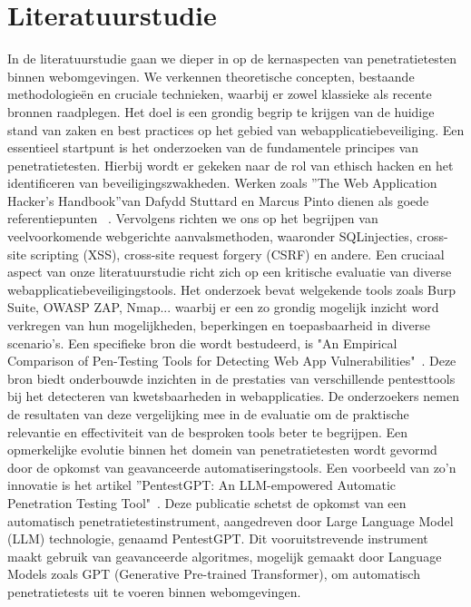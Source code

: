 \section{Literatuurstudie}%
\label{sec:literatuurstudie}

In de literatuurstudie gaan we dieper in op de
kernaspecten van penetratietesten binnen webomgevingen.
We verkennen theoretische concepten,
bestaande methodologieën en cruciale
technieken, waarbij er zowel klassieke als recente
bronnen raadplegen. Het doel is een grondig begrip
te krijgen van de huidige stand van zaken en
best practices op het gebied van webapplicatiebeveiliging.
Een essentieel startpunt is het onderzoeken
van de fundamentele principes van penetratietesten.
Hierbij wordt er gekeken naar de rol van
ethisch hacken en het identificeren van beveiligingszwakheden.
Werken zoals ”The Web Application
Hacker’s Handbook”van Dafydd Stuttard
en Marcus Pinto dienen als goede referentiepunten
~\autocite{Stuttard2011}. Vervolgens richten
we ons op het begrijpen van veelvoorkomende
webgerichte aanvalsmethoden, waaronder SQLinjecties,
cross-site scripting (XSS), cross-site request
forgery (CSRF) en andere.
Een cruciaal aspect van onze literatuurstudie
richt zich op een kritische evaluatie van diverse
webapplicatiebeveiligingstools. Het onderzoek
bevat welgekende tools zoals Burp Suite, OWASP
ZAP, Nmap... waarbij er een zo grondig mogelijk
inzicht word verkregen van hun mogelijkheden,
beperkingen en toepasbaarheid in diverse scenario's. Een specifieke bron die wordt bestudeerd,
is "An Empirical Comparison of Pen-Testing Tools
for Detecting Web App Vulnerabilities"~\autocite{Albahar2022}. Deze bron biedt onderbouwde inzichten
in de prestaties van verschillende pentesttools
bij het detecteren van kwetsbaarheden
in webapplicaties. De onderzoekers nemen de resultaten
van deze vergelijking mee in de evaluatie
om de praktische relevantie en effectiviteit van de
besproken tools beter te begrijpen.
Een opmerkelijke evolutie binnen het domein
van penetratietesten wordt gevormd door de opkomst
van geavanceerde automatiseringstools. Een
voorbeeld van zo'n innovatie is het artikel ”PentestGPT:
An LLM-empowered Automatic Penetration
Testing Tool"~\autocite{Deng2023}. Deze publicatie
schetst de opkomst van een automatisch penetratietestinstrument,
aangedreven door Large
Language Model (LLM) technologie, genaamd PentestGPT.
Dit vooruitstrevende instrument maakt
gebruik van geavanceerde algoritmes, mogelijk
gemaakt door Language Models zoals GPT (Generative
Pre-trained Transformer), om automatisch
penetratietests uit te voeren binnen webomgevingen.
